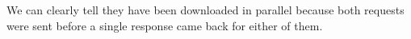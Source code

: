 We can clearly tell they have been downloaded in parallel because both requests were sent before a single response came back for either of them.